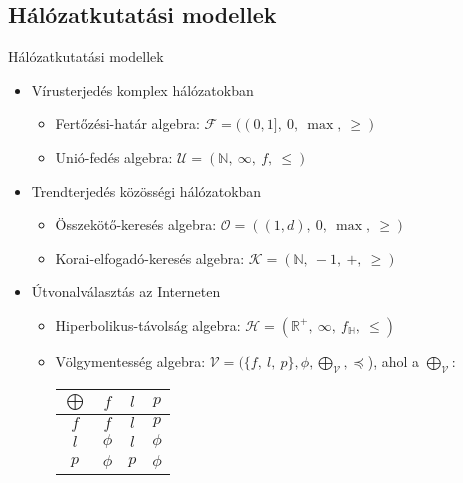   \subsection{Hálózatkutatási modellek}
  \begin{frame}{Hálózatkutatási modellek}
    \begin{itemize}
      \item<1-> Vírusterjedés komplex hálózatokban
      \begin{itemize}
        \item<4-> Fertőzési-határ algebra: $\mathcal{F} = ((0,1],~0,~\max,~\geq)$
        \item<4-> Unió-fedés algebra: $\mathcal{U} = (\mathbb{N},~\infty,~f,~\leq)$
      \end{itemize}
      \item<2-> Trendterjedés közösségi hálózatokban
      \begin{itemize}
        \item<5-> Összekötő-keresés algebra: $\mathcal{O} = ((1,d),~0,~\max,~\geq)$
        \item<5-> Korai-elfogadó-keresés algebra: $\mathcal{K} = (\mathbb{N},~-1,~+,~\geq)$
      \end{itemize}
      \item<3-> Útvonalválasztás az Interneten
      \begin{itemize}
        \item<6-> Hiperbolikus-távolság algebra: $\mathcal{H} = (\mathbb{R}^{+},~\infty,~f_{\mathbb{H}},~\leq)$
        \item<6-> Völgymentesség algebra: $\mathcal{V} = (\{f,~l,~p\},\phi,\bigoplus_{\mathcal{V}},\preceq$), ahol a $\bigoplus_{\mathcal{V}}:$
        \begin{table}
          \footnotesize
          \begin{tabular}{ c | c c c }
            $\bigoplus$ & $f$ & $l$ & $p$\\
            \hline
            $f$ & $f$ & $l$ & $p$\\
            $l$ & $\phi$ & $l$ & $\phi$\\
            $p$ & $\phi$ & $p$ & $\phi$\\
          \end{tabular}
        \end{table}
      \end{itemize}
    \end{itemize}
  \end{frame}



